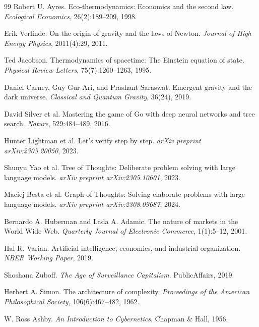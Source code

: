 \documentclass[11pt]{article}
\theoremstyle{plain}
\theoremstyle{definition}
\theoremstyle{remark}
\begin{document}
\begin{thebibliography}{99}
Robert U. Ayres.
\newblock Eco-thermodynamics: Economics and the second law.
\newblock \emph{Ecological Economics}, 26(2):189--209, 1998.

Erik Verlinde.
\newblock On the origin of gravity and the laws of Newton.
\newblock \emph{Journal of High Energy Physics}, 2011(4):29, 2011.

Ted Jacobson.
\newblock Thermodynamics of spacetime: The Einstein equation of state.
\newblock \emph{Physical Review Letters}, 75(7):1260--1263, 1995.

Daniel Carney, Guy Gur-Ari, and Prashant Saraswat.
\newblock Emergent gravity and the dark universe.
\newblock \emph{Classical and Quantum Gravity}, 36(24), 2019.

David Silver et al.
\newblock Mastering the game of Go with deep neural networks and tree search.
\newblock \emph{Nature}, 529:484--489, 2016.

Hunter Lightman et al.
\newblock Let's verify step by step.
\newblock \emph{arXiv preprint arXiv:2305.20050}, 2023.

Shunyu Yao et al.
\newblock Tree of Thoughts: Deliberate problem solving with large language models.
\newblock \emph{arXiv preprint arXiv:2305.10601}, 2023.

Maciej Besta et al.
\newblock Graph of Thoughts: Solving elaborate problems with large language models.
\newblock \emph{arXiv preprint arXiv:2308.09687}, 2024.

Bernardo A. Huberman and Lada A. Adamic.
\newblock The nature of markets in the World Wide Web.
\newblock \emph{Quarterly Journal of Electronic Commerce}, 1(1):5--12, 2001.

Hal R. Varian.
\newblock Artificial intelligence, economics, and industrial organization.
\newblock \emph{NBER Working Paper}, 2019.

Shoshana Zuboff.
\newblock \emph{The Age of Surveillance Capitalism}.
\newblock PublicAffairs, 2019.

Herbert A. Simon.
\newblock The architecture of complexity.
\newblock \emph{Proceedings of the American Philosophical Society}, 106(6):467--482, 1962.

W. Ross Ashby.
\newblock \emph{An Introduction to Cybernetics}.
\newblock Chapman \& Hall, 1956.

\end{thebibliography}
\end{document}

